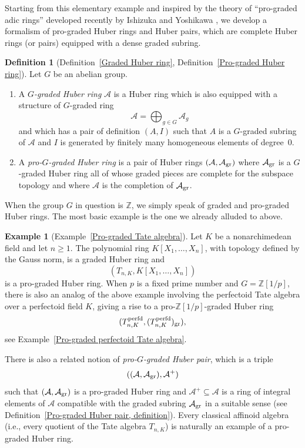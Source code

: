 \documentclass[12pt,twoside,a4paper]{article}
\theoremstyle{definition}
\newtheorem{mydef}[thm]{Definition}
\newtheorem{example}[thm]{Example}
\theoremstyle{remark}
\newcommand\gr{{\rm gr}}
\newcommand\perfd{{\rm perfd}}
\begin{document}
Starting from this elementary example and inspired by the theory of ``pro-graded adic rings'' developed recently by Ishizuka and Yoshikawa \cite{Ishizuka-Yoshikawa25}, we develop a formalism of pro-graded Huber rings and Huber pairs, which are complete Huber rings (or pairs) equipped with a dense graded subring. 
\begin{mydef}[Definition~\ref{Graded Huber ring}, Definition~\ref{Pro-graded Huber ring}]Let $G$ be an abelian group.~\begin{enumerate}[(1)]\item A \textit{$G$-graded Huber ring} $\mathcal{A}$ is a Huber ring which is also equipped with a structure of $G$-graded ring \begin{equation*}\mathcal{A}=\bigoplus_{g\in G}\mathcal{A}_{g}\end{equation*}and which has a pair of definition $(A, I)$ such that $A$ is a $G$-graded subring of $\mathcal{A}$ and $I$ is generated by finitely many homogeneous elements of degree~$0$. \item A \textit{pro-$G$-graded Huber ring} is a pair of Huber rings $(\mathcal{A}, \mathcal{A}_{\gr})$ where $\mathcal{A}_{\gr}$ is a $G$-graded Huber ring all of whose graded pieces are complete for the subspace topology and where $\mathcal{A}$ is the completion of $\mathcal{A}_{\gr}$. \end{enumerate} \end{mydef}
When the group $G$ in question is $\mathbb{Z}$, we simply speak of graded and pro-graded Huber rings. The most basic example is the one we already alluded to above. 
\begin{example}[Example~\ref{Pro-graded Tate algebra}]Let $K$ be a nonarchimedean field and let $n\geq1$. The polynomial ring $K[X_1,\dots, X_n]$, with topology defined by the Gauss norm, is a graded Huber ring and \begin{equation*}(T_{n, K}, K[X_1,\dots, X_n])\end{equation*}is a pro-graded Huber ring. When $p$ is a fixed prime number and $G=\mathbb{Z}[1/p]$, there is also an analog of the above example involving the perfectoid Tate algebra over a perfectoid field $K$, giving a rise to a pro-$\mathbb{Z}[1/p]$-graded Huber ring \begin{equation*}(T_{n, K}^{\perfd}, (T_{n, K}^{\perfd})_{\gr}),\end{equation*}see Example~\ref{Pro-graded perfectoid Tate algebra}.\end{example}
There is also a related notion of \textit{pro-$G$-graded Huber pair}, which is a triple \begin{equation*}((\mathcal{A}, \mathcal{A}_{\gr}), \mathcal{A}^{+})\end{equation*}such that $(\mathcal{A}, \mathcal{A}_{\gr})$ is a pro-graded Huber ring and $\mathcal{A}^{+}\subseteq \mathcal{A}$ is a ring of integral elements of $\mathcal{A}$ compatible with the graded subring $\mathcal{A}_{\gr}$ in a suitable sense (see Definition~\ref{Pro-graded Huber pair, definition}). Every classical affinoid algebra (i.e., every quotient of the Tate algebra $T_{n, K}$) is naturally an example of a pro-graded Huber ring. 
\end{document}
